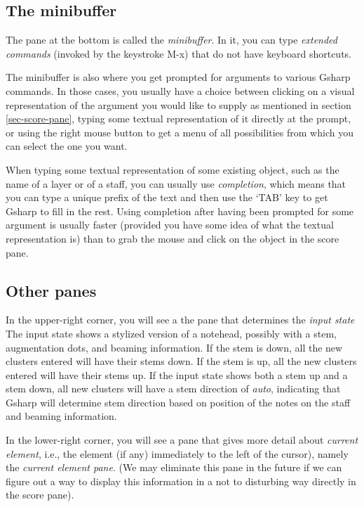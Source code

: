 \documentclass[11pt]{book}
\def\gs{Gsharp}
\def\kbd#1{`#1'}
\begin{document}
\subsection{The minibuffer}
\label{sec-minibuffer}

The pane at the bottom is called the
\emph{minibuffer}.  In it, you can type
\emph{extended commands} (invoked by the keystroke M-x) that do not
have keyboard shortcuts.

The minibuffer is also where you get prompted for arguments to various
{\gs} commands.  In those cases, you usually have a choice between
clicking on a visual representation of the argument you would like to
supply as mentioned in section \ref{sec-score-pane}, typing some
textual representation of it directly at the prompt, or using the
right mouse button to get a menu of all possibilities from which you
can select the one you want. 

When typing some textual representation of some existing object, such
as the name of a layer or of a staff, you can usually use
\emph{completion}, which means that you can type a
unique prefix of the text and then use the \kbd{TAB} key to get {\gs}
to fill in the rest.  Using completion after having been prompted for
some argument is usually faster (provided you have some idea of what
the textual representation is) than to grab the mouse and click on the
object in the score pane.

\subsection{Other panes}

In the upper-right corner, you will see a the pane that determines the
\emph{input state}
The input state shows a stylized version of a notehead, possibly with
a stem, augmentation dots, and beaming information.  If the stem is
down, all the new clusters entered will have their stems down.  If the
stem is up, all the new clusters entered will have their stems up.  If
the input state shows both a stem up and a stem down, all new
clusters will have a stem direction of \emph{auto}, indicating that
{\gs} will determine stem direction based on position of the notes on
the staff and beaming information. 

In the lower-right corner, you will see a pane that gives more detail
about \emph{current element}, i.e., the element (if any)
immediately to the left of the cursor), namely the \emph{current
  element pane}. (We may eliminate this pane in the
future if we can figure out a way to display this information in a not
to disturbing way directly in the score pane).
\end{document}
